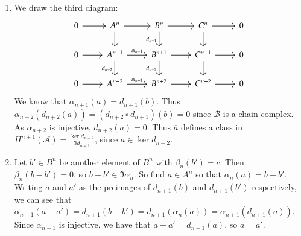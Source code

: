 \documentclass[12pt]{article}
\theoremstyle{definition}
\theoremstyle{definitionstyle}
\begin{document}
\begin{enumerate}[label=(\alph*)]
        \item We draw the third diagram:
        \[\begin{tikzcd}
            0 & {A^n} & {B^n} & {C^n} & 0 \\
            0 & {A^{n+1}} & {B^{n+1}} & {C^{n+1}} & 0 \\
            0 & {A^{n+2}} & {B^{n+2}} & {C^{n+2}} & 0
            \arrow[from=1-1, to=1-2]
            \arrow[from=1-2, to=1-3]
            \arrow[from=1-2, to=2-2]
            \arrow[from=1-3, to=1-4]
            \arrow["{d_{n+1}}"', from=1-3, to=2-3]
            \arrow[from=1-4, to=1-5]
            \arrow[from=1-4, to=2-4]
            \arrow[from=2-1, to=2-2]
            \arrow["{\alpha_{n+1}}", from=2-2, to=2-3]
            \arrow["{d_{n+2}}"', from=2-2, to=3-2]
            \arrow[from=2-3, to=2-4]
            \arrow["{d_{n+2}}"', from=2-3, to=3-3]
            \arrow[from=2-4, to=2-5]
            \arrow[from=2-4, to=3-4]
            \arrow[from=3-1, to=3-2]
            \arrow["{\alpha_{n+2}}", from=3-2, to=3-3]
            \arrow[from=3-3, to=3-4]
            \arrow[from=3-4, to=3-5]
        \end{tikzcd}\]
        We know that $\alpha_{n+1}(a) = d_{n+1}(b)$. Thus $\alpha_{n+2}(d_{n+2}(a)) = (d_{n+2} \circ d_{n+1})(b) = 0$ since $\mathscr{B}$ is a chain complex. As $\alpha_{n+2}$ is injective, $d_{n+2}(a) = 0$. Thus $\overline a$ defines a class in $H^{n+1}(\mathscr A) = \frac{\ker d_{n+2}}{\Im d_{n+1}}$, since $a \in \ker d_{n+2}$.
        \item Let $b' \in B^n$ be another element of $B^n$ with $\beta_n(b') = c$. Then $\beta_n(b - b') = 0$, so $b - b' \in \Im \alpha_n$. So find $a \in A^n$ so that $\alpha_n(a) = b - b'$. Writing $a$ and $a'$ as the preimages of $d_{n+1}(b)$ and $d_{n+1}(b')$ respectively, we can see that $\alpha_{n+1}(a - a') = d_{n+1}(b - b') = d_{n+1}(\alpha_n(a)) = \alpha_{n+1}(d_{n+1}(a))$. Since $\alpha_{n+1}$ is injective, we have that $a - a' = d_{n+1}(a)$, so $\overline{a} = \overline{a'}$.
        

\end{enumerate}
\end{document}
